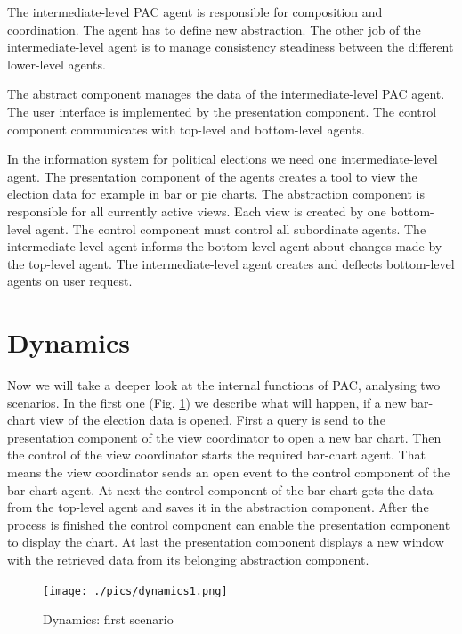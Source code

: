 \documentclass{scrbook}
\begin{document}
The intermediate-level PAC agent is responsible for composition and coordination. The agent has to define new abstraction. The other job of the intermediate-level agent is to manage consistency steadiness between the different lower-level agents. 

The abstract component manages the data of the intermediate-level PAC agent. The user interface is implemented by the presentation component. The control component communicates with top-level and bottom-level agents. 

In the information system for political elections we need one intermediate-level agent. The presentation component of the agents creates a tool to view the election data for example in bar or pie charts.  The abstraction component is responsible for all currently active views. Each view is created by one bottom-level agent. The control component must control all subordinate agents. The intermediate-level agent informs the bottom-level agent about changes made by the top-level agent. The intermediate-level agent creates and deflects bottom-level agents on user request. 


\section{Dynamics}	%

Now we will take a deeper look at the internal functions of PAC, analysing two scenarios.  In the first one (Fig. \ref{abb:dyn1}) we describe what will happen, if a new bar-chart view of the election data is opened.
First a query is send to the presentation component of the view coordinator to open a new bar chart. Then the control of the view coordinator starts the required bar-chart agent. That means the view coordinator sends an open event to the control component of the bar chart agent. At next the control component of the bar chart gets the data from the top-level agent and saves it in the abstraction component. After the process is finished the control component can enable the presentation component to display the chart. At last the presentation component displays a new window with the retrieved data from its belonging abstraction component.

\begin{figure}
 \centering
 \texttt{[image: ./pics/dynamics1.png]}
 \caption[Cap]{Dynamics: first scenario\endnotemark[1]}
 \label{abb:dyn1}
\end{figure}
\end{document}
